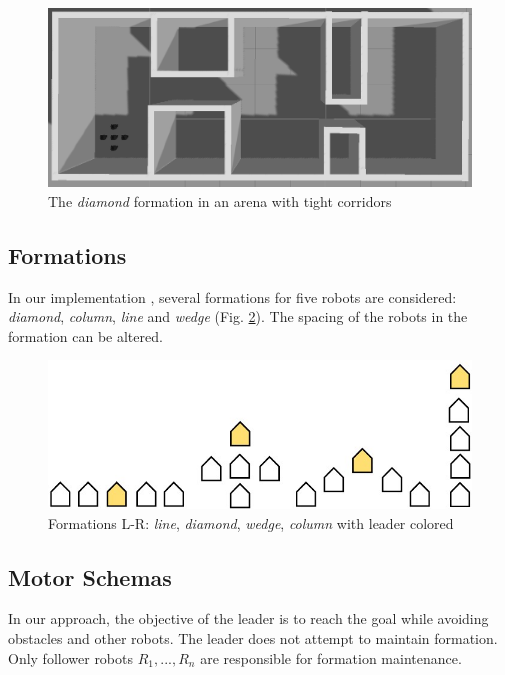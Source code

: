 \documentclass[letterpaper, 10 pt, conference]{ieeeconf}  %
\begin{document}
	\begin{figure}[thpb]
		\centering
		\includegraphics[width=\linewidth]{images/corridorworld.png}
		\caption{The \textit{diamond} formation in an arena with tight corridors}
		\label{corridorworld}
	\end{figure}
	
	\subsection{Formations}
	
	In our implementation \cite{repository}, several formations for five robots are considered: \textit{diamond}, \textit{column}, \textit{line} and \textit{wedge} (Fig. \ref{formation_shapes}). The spacing of the robots in the formation can be altered. 
	
	\begin{figure}[thpb]
		\centering
		\includegraphics[width=0.7\linewidth]{images/formation_shapes.jpg}
		\caption{Formations L-R: \textit{line}, \textit{diamond}, \textit{wedge}, \textit{column} with leader colored}
		\label{formation_shapes}
	\end{figure}
	
	\subsection{Motor Schemas}
	In our approach, the objective of the leader is to reach the goal while avoiding obstacles and other robots. The leader does not attempt to maintain formation. Only follower robots $R_1, ..., R_n$ are responsible for formation maintenance. 
	
\end{document}
